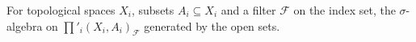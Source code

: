 For topological spaces $X_i$, subsets $A_i\subseteq X_i$ and a filter $\mathcal F$ on the index set, the $\sigma$-algebra on $\prod'_i(X_i,A_i)_{\mathcal F}$ generated by the open sets.
